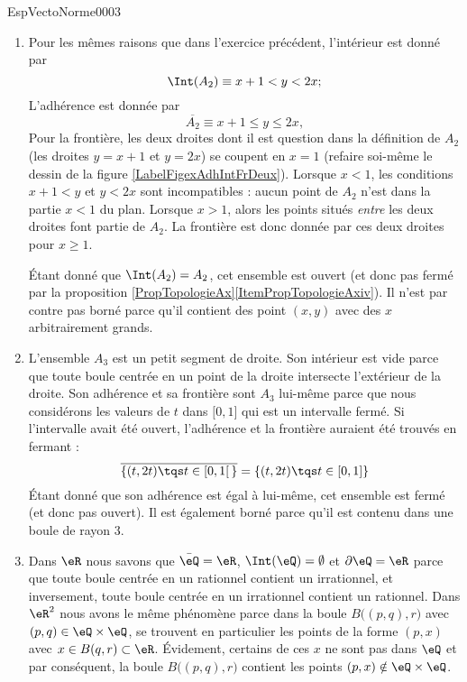 \begin{corrige}{EspVectoNorme0003}
\begin{enumerate}
		\item
			Pour les mêmes raisons que dans l'exercice précédent, l'intérieur est donné par
			\begin{equation}
				\Int(A_2)\equiv x+1<y<2x;
			\end{equation}
			L'adhérence est donnée par
			\begin{equation}
				\overline{ A_2 }\equiv x+1\leq y\leq 2x,
			\end{equation}
			Pour la frontière, les deux droites dont il est question dans la définition de $A_2$ (les droites $y=x+1$ et $y=2x$) se coupent en $x=1$ (refaire soi-même le dessin de la figure \ref{LabelFigexAdhIntFrDeux}). Lorsque $x<1$, les conditions $x+1<y$ et $y<2x$ sont incompatibles : aucun point de $A_2$ n'est dans la partie $x<1$ du plan. Lorsque $x>1$, alors les points situés \emph{entre} les deux droites font partie de $A_2$. La frontière est donc donnée par ces deux droites pour $x\geq 1$. 

			Étant donné que $\Int(A_2)=A_2$, cet ensemble est ouvert (et donc pas fermé par la proposition \ref{PropTopologieAx}\ref{ItemPropTopologieAxiv}). Il n'est par contre pas borné parce qu'il contient des point $(x,y)$ avec des $x$ arbitrairement grands.

		\item
			L'ensemble $A_3$ est un petit segment de droite. Son intérieur est vide parce que toute boule centrée en un point de la droite intersecte l'extérieur de la droite. Son adhérence et sa frontière sont $A_3$ lui-même parce que nous considérons les valeurs de $t$ dans $\mathopen[ 0 , 1 \mathclose]$ qui est un intervalle fermé. Si l'intervalle avait été ouvert, l'adhérence et la frontière auraient été trouvés en fermant :
			\begin{equation}
                \overline{ \{ (t,2t)\tqs t\in\mathopen[ 0 , 1 [\, \}}=\{ (t,2t)\tqs t\in\mathopen[ 0 , 1 ] \}
			\end{equation}
			Étant donné que son adhérence est égal à lui-même, cet ensemble est fermé (et donc pas ouvert). Il est également borné parce qu'il est contenu dans une boule de rayon $3$.
		\item
			Dans $\eR$ nous savons que $\bar\eQ=\eR$, $\Int(\eQ)=\emptyset$ et $\partial\eQ=\eR$ parce que toute boule centrée en un rationnel contient un irrationnel, et inversement, toute boule centrée en un irrationnel contient un rationnel. Dans $\eR^2$ nous avons le même phénomène parce dans la boule $B\big( (p,q),r \big)$ avec $(p,q)\in\eQ\times\eQ$, se trouvent en particulier les points de la forme $(p,x)$ avec $x\in B(q,r)\subset\eR$. Évidement, certains de ces $x$ ne sont pas dans $\eQ$ et par conséquent, la boule $B\big( (p,q),r \big)$ contient les points $(p,x)\notin\eQ\times\eQ$.


\end{enumerate}
\end{corrige}
